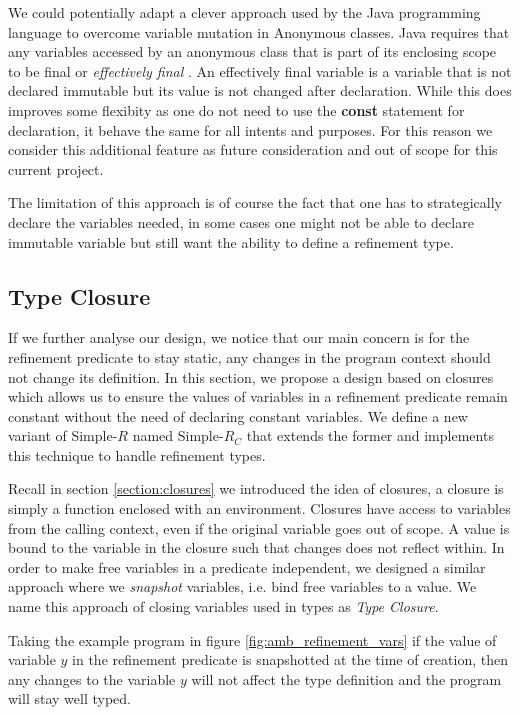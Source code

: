 \documentclass[a4paper,12pt]{report}
\begin{document}
\par
We could potentially adapt a clever approach used by the Java programming 
language to overcome variable mutation in Anonymous classes. Java requires that 
any variables accessed by an anonymous class that is part of 
its enclosing scope to be final or \textit{effectively final} 
\cite{effectFinal}. An effectively final variable is a variable that is not 
declared immutable but its value is not changed after declaration. While this 
does improves some flexibity as one do not need to use the \textbf{const} 
statement for declaration, it behave the same for all intents and purposes. 
For this reason we consider this additional feature as future consideration and 
out of scope for this current project. 

\par
The limitation of this approach is of course the fact that one has to strategically 
declare the variables needed, in some cases one might not be able to declare 
immutable variable but still want the ability to define a refinement type.

\subsection{Type Closure}
If we further analyse our design, we notice that our main concern is for the 
refinement predicate to stay static, any changes in the program context should 
not change its definition. In this section, we propose a design based on closures 
which allows us to ensure the values of variables in a refinement predicate remain 
constant without the need of declaring constant variables. We define a new variant of 
Simple-$R$ named Simple-$R_{C}$ that extends the former and implements this 
technique to handle refinement types. 

\par
Recall in section \ref{section:closures} we introduced the idea of closures, a 
closure is simply a function enclosed with an environment. Closures have access to 
variables from the calling context, even if the original variable goes out of 
scope. A value is bound to the variable in the closure such that changes does 
not reflect within. In order to make free variables in a predicate independent, 
we designed a similar approach where we \emph{snapshot} variables, i.e. 
bind free variables to a value. We name this approach of closing 
variables used in types as \emph{Type Closure}. 

\par
Taking the example program in figure \ref{fig:amb_refinement_vars} if the 
value of variable $y$ in the refinement predicate is snapshotted at the time of 
creation, then any changes to the variable $y$ will not 
affect the type definition and the program will stay well typed.
\end{document}
